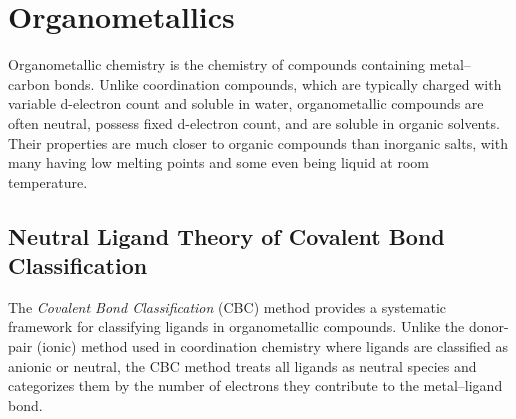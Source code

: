 \section{Organometallics}
%
Organometallic chemistry is the chemistry of compounds containing metal--carbon bonds.
Unlike coordination compounds, which are typically charged with variable d-electron count and soluble in water, 
organometallic compounds are often neutral, possess fixed d-electron count, and are soluble in organic solvents.
Their properties are much closer to organic compounds than inorganic salts, with many having low melting points 
and some even being liquid at room temperature.
%
\subsection{Neutral Ligand Theory of Covalent Bond Classification}
%
The \emph{Covalent Bond Classification} (CBC) method 
provides a systematic framework for classifying ligands in organometallic compounds.
Unlike the donor-pair (ionic) method used in coordination chemistry where ligands are classified as anionic or neutral,
the CBC method treats all ligands as neutral species and categorizes them by the number of electrons 
they contribute to the metal--ligand bond.
%
